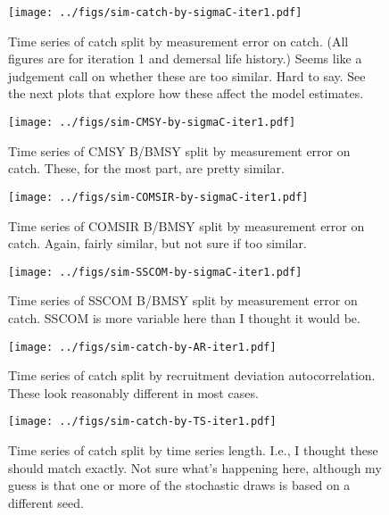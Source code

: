 \documentclass[12pt]{article}
\begin{document}
\begin{figure}[htbp]
\begin{center}
  \texttt{[image: ../figs/sim-catch-by-sigmaC-iter1.pdf]}
\caption{Time series of catch split by measurement error on catch. (All
  figures are for iteration 1 and demersal life history.) Seems like a
  judgement call on whether these are too similar. Hard to say. See the next
  plots that explore how these affect the model estimates.}
\end{center}
\end{figure}

\begin{figure}[htbp]
\begin{center}
  \texttt{[image: ../figs/sim-CMSY-by-sigmaC-iter1.pdf]}
\caption{Time series of CMSY B/BMSY split by measurement error on catch.
  These, for the most part, are pretty similar.}
\end{center}
\end{figure}

\begin{figure}[htbp]
\begin{center}
  \texttt{[image: ../figs/sim-COMSIR-by-sigmaC-iter1.pdf]}
\caption{Time series of COMSIR B/BMSY split by measurement error on catch.
  Again, fairly similar, but not sure if too similar.}
\end{center}
\end{figure}

\begin{figure}[htbp]
\begin{center}
  \texttt{[image: ../figs/sim-SSCOM-by-sigmaC-iter1.pdf]}
\caption{Time series of SSCOM B/BMSY split by measurement error on catch.
  SSCOM is more variable here than I thought it would be.}
\end{center}
\end{figure}

\begin{figure}[htbp]
\begin{center}
  \texttt{[image: ../figs/sim-catch-by-AR-iter1.pdf]}
\caption{Time series of catch split by recruitment deviation autocorrelation.
These look reasonably different in most cases.}
\end{center}
\end{figure}


\begin{figure}[htbp]
\begin{center}
  \texttt{[image: ../figs/sim-catch-by-TS-iter1.pdf]}
\caption{Time series of catch split by time series length. I.e., I
    thought these should match exactly. Not sure what's happening here,
    although my guess is that one or more of the stochastic draws is based on
  a different seed.}
\end{center}
\end{figure}
\end{document}
